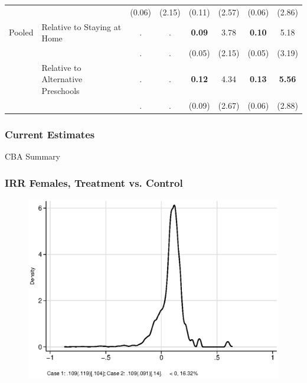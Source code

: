 \documentclass[static]{JJH-Beamer}
\begin{document}
\begin{frame}[shrink=30]
\begin{tabular}{llcccccc}
		&										& (0.06)&(2.15)	&(0.11)&(2.57)& (0.06)& (2.86) 			\\ 
Pooled  & Relative to Staying at Home			& 	.	& 	.	&\textbf{0.09}&3.78		& \textbf{0.10}	& 5.18  		\\
		&										&	.	&	.	&(0.05)&(2.15)& (0.05)& (3.19) 			\\ 
		& Relative to Alternative Preschools	& 	.	& 	.	&\textbf{0.12}&4.34& \textbf{0.13}	& \textbf{5.56} 		\\
		&										&	.	&	.	&(0.09)&(2.67)& (0.06)	& (2.88) 			\\ 
\end{tabular}
\end{frame}


\begin{frame}
\frametitle{Current Estimates}
\begin{center}
\begin{table}
	\caption{CBA Summary}
	\scalebox{.40}{}
\end{table}
\end{center}
\end{frame}


\begin{frame}
\frametitle{IRR Females, Treatment vs. Control} 
\begin{figure}
	\includegraphics[width=.8\columnwidth]{output/irr_2_sexf.eps}
\end{figure}
\end{frame}

\end{document}
